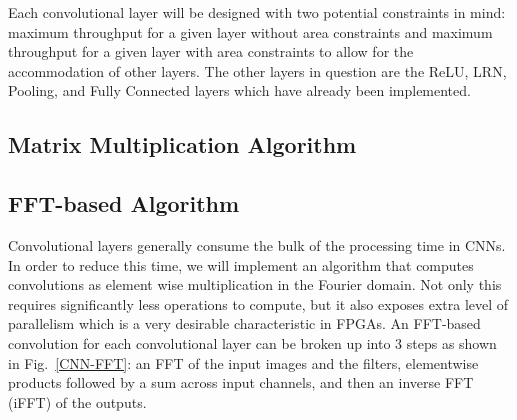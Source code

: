 \documentclass[conference,compsoc]{IEEEtran/IEEEtran}
\begin{document}
Each convolutional layer will be designed with two potential constraints in mind: 
maximum throughput for a given layer without area constraints and maximum throughput
for a given layer with area constraints to allow for the accommodation of other 
layers. The other layers in question are the ReLU, LRN, Pooling, and Fully Connected
layers which have already been implemented. 


\subsection{Matrix Multiplication Algorithm}


\subsection{FFT-based Algorithm}
Convolutional layers generally consume the bulk of the processing time in CNNs. In order to reduce this time, we will implement an algorithm that computes convolutions as element wise multiplication in the Fourier domain. Not only this requires significantly less operations to compute, but it also exposes extra level of parallelism which is a very desirable characteristic in FPGAs. An FFT-based convolution for each convolutional layer can be broken up into $3$ steps as shown in Fig.~\ref{CNN-FFT}: an FFT of the input images and the filters, elementwise products followed by a sum across input channels, and then an inverse FFT (iFFT) of the outputs.
\end{document}
